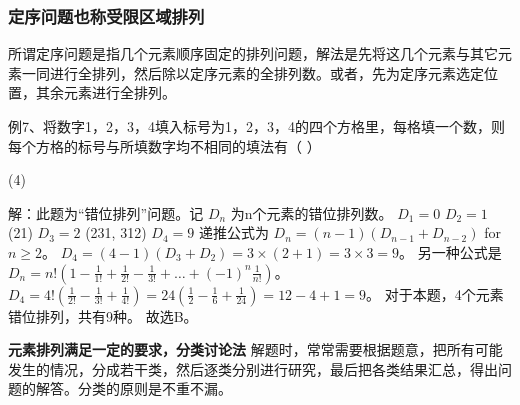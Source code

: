 \subsubsection{定序问题\*也称受限区域排列}
所谓定序问题是指几个元素顺序固定的排列问题，解法是先将这几个元素与其它元素一同进行全排列，然后除以定序元素的全排列数。或者，先为定序元素选定位置，其余元素进行全排列。

\begin{example}
    例7、将数字1，2，3，4填入标号为1，2，3，4的四个方格里，每格填一个数，则每个方格的标号与所填数字均不相同的填法有（ ）
    \begin{tasks}(4)
    \end{tasks}
\end{example}
\begin{solution}
    解：此题为“错位排列”问题。记 $D_n$ 为n个元素的错位排列数。
    $D_1 = 0$
    $D_2 = 1$ (21)
    $D_3 = 2$ (231, 312)
    $D_4 = 9$
    递推公式为 $D_n = (n-1)(D_{n-1} + D_{n-2})$ for $n \ge 2$。
    $D_4 = (4-1)(D_3 + D_2) = 3 \times (2+1) = 3 \times 3 = 9$。
    另一种公式是 $D_n = n! \left(1 - \frac{1}{1!} + \frac{1}{2!} - \frac{1}{3!} + \dots + (-1)^n \frac{1}{n!}\right)$。
    $D_4 = 4! \left(\frac{1}{2!} - \frac{1}{3!} + \frac{1}{4!}\right) = 24 \left(\frac{1}{2} - \frac{1}{6} + \frac{1}{24}\right) = 12 - 4 + 1 = 9$。
    对于本题，4个元素错位排列，共有9种。
    故选B。
\end{solution}

\noindent\textbf{元素排列满足一定的要求，分类讨论法}
\newline
解题时，常常需要根据题意，把所有可能发生的情况，分成若干类，然后逐类分别进行研究，最后把各类结果汇总，得出问题的解答。分类的原则是不重不漏。

